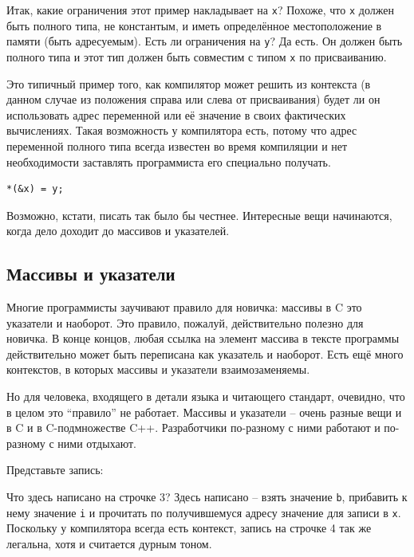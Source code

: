 \documentclass[a4paper,12pt,oneside]{article}
\begin{document}
Итак, какие ограничения этот пример накладывает на \lstinline!x!? Похоже, что \lstinline!x! должен быть полного типа, не константым, и иметь определённое местоположение в памяти (быть адресуемым). Есть ли ограничения на \lstinline!y!? Да есть. Он должен быть полного типа и этот тип должен быть совместим с типом \lstinline!x! по присваиванию.  

Это типичный пример того, как компилятор может решить из контекста (в данном случае из положения справа или слева от присваивания) будет ли он использовать адрес переменной или её значение в своих фактических вычислениях. Такая возможность у компилятора есть, потому что адрес переменной полного типа всегда известен во время компиляции и нет необходимости заставлять программиста его специально получать.

\begin{lstlisting}
*(&x) = y;
\end{lstlisting}

Возможно, кстати, писать так было бы честнее. Интересные вещи начинаются, когда дело доходит до массивов и указателей.

\pagebreak
\subsection{Массивы и указатели}

Многие программисты заучивают правило для новичка: массивы в C это указатели и наоборот. Это правило, пожалуй, действительно полезно для новичка. В конце концов, любая ссылка на элемент массива в тексте программы действительно может быть переписана как указатель и наоборот. Есть ещё много контекстов, в которых массивы и указатели взаимозаменяемы.

Но для человека, входящего в детали языка и читающего стандарт, очевидно, что в целом это ``правило'' не работает. Массивы и указатели – очень разные вещи и в C и в C-подмножестве C++. Разработчики по-разному с ними работают и по-разному с ними отдыхают.

Представьте запись:



Что здесь написано на строчке 3? Здесь написано – взять значение \lstinline!b!, прибавить к нему значение \lstinline!i! и прочитать по получившемуся адресу значение для записи в \lstinline!x!. Поскольку у компилятора всегда есть контекст, запись на строчке 4 так же легальна, хотя и считается дурным тоном.
\end{document}
